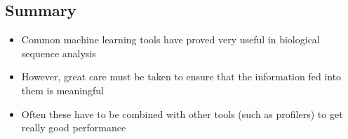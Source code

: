 
\begin{slide}
\section{Summary}

\begin{PauseHighLight}
  \begin{itemize}
  \item Common machine learning tools have proved very useful in
    biological sequence analysis\pause
  \item However, great care must be taken to ensure that the information
    fed into them is meaningful\pause
  \item Often these have to be combined with other tools (such as
    profilers) to get really good performance\pause
  \end{itemize}
\end{PauseHighLight}

\end{slide}


